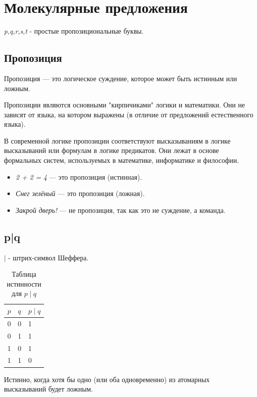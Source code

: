 \documentclass[a4paper, 12pt]{article}
\begin{document}
\section{Молекулярные предложения}
\textit{p,q,r,s,t} - простые пропозициональные буквы.
\subsection{Пропозиция}
Пропозиция — это логическое суждение, которое может быть истинным или ложным.

Пропозиции являются основными "кирпичиками" логики и математики.
Они не зависят от языка, на котором выражены (в отличие от предложений естественного языка).

В современной логике пропозиции соответствуют высказываниям в логике высказываний или формулам в логике предикатов. Они лежат в основе формальных систем, используемых в математике, информатике и философии.

\begin{itemize} 
 \item \textit{2 + 2 = 4} — это пропозиция (истинная).
 \item \textit{Снег зелёный} — это пропозиция (ложная).
 \item \textit{Закрой дверь!} — не пропозиция, так как это не суждение, а команда.
\end{itemize}

\subsection{p|q}
$\mid$ - штрих-символ Шеффера.
\begin{table}[h]
    \centering
    \caption{Таблица истинности для $p \mid q$}
    \label{tab:equalwidth}
    \begin{tabularx}{\textwidth}{|X|X|X|}
        \hline
        \textbf{$p$} & \textbf{$q$} & \textbf{$p \mid q$}\\
        \hline
        0 & 0 & 1 \\
        \hline
        0 & 1 & 1 \\
        \hline
        1 & 0 & 1 \\
        \hline
        1 & 1 & 0 \\
        \hline
    \end{tabularx}
\end{table}

Истинно, когда хотя бы одно (или оба одновременно) из атомарных высказываний будет ложным.
\end{document}

